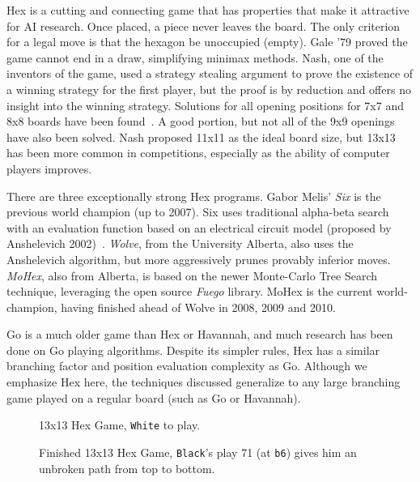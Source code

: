 \documentclass{acm_proc_article-sp}
\newcommand{\black}{\texttt{Black}}
\newcommand{\white}{\texttt{White}}
\newcommand{\loc}[1]{\texttt{#1}}
\begin{document}
Hex is a cutting and connecting game that
has properties that make it attractive for AI research. 
Once placed, a piece never leaves the board. 
The only criterion for a legal move is that the hexagon be unoccupied (empty). 
Gale '79 proved the game cannot end in a draw, simplifying minimax methods. 
Nash, one of the inventors of the game, used a strategy stealing argument to prove the existence of a winning strategy for the first player, but the proof is by reduction and offers no insight into the winning strategy.
Solutions for all opening positions for 7x7 and 8x8 boards have been found~\cite{henderson2009solving}. 
A good portion, but not all of the 9x9 openings have also been solved. 
Nash proposed 11x11 as the ideal board size, but 13x13 has been more common in competitions, especially as the ability of computer players improves.

There are three exceptionally strong Hex programs.  Gabor Melis' \emph{Six} is the previous world champion (up to 2007). 
Six uses traditional alpha-beta search with an evaluation function based on an electrical circuit model (proposed by Anshelevich 2002)~\cite{anshelevich2002hierarchical}. 
\emph{Wolve}, from the University Alberta, also uses the Anshelevich algorithm, but more aggressively prunes provably inferior moves. 
\emph{MoHex}, also from Alberta, is based on the newer Monte-Carlo Tree Search technique, leveraging the open source \emph{Fuego} library. 
MoHex is the current world-champion, having finished ahead of Wolve in 2008, 2009 and 2010.

Go is a much older game than Hex or Havannah, and much research has been done on Go playing algorithms. 
Despite its simpler rules, Hex has a similar branching factor and position evaluation complexity as Go. 
Although we emphasize Hex here, the techniques discussed generalize to any large branching game played on a regular board
(such as Go or Havannah).

\begin{figure}[tb]
	\caption{13x13 Hex Game, \white{} to play.}
	\label{fig:13x13inprogress}
\end{figure}

\begin{figure}[tb]
	\caption{Finished 13x13 Hex Game, \black{}'s play 71 (at \loc{b6}) gives him an unbroken path from top to bottom.}
	\label{fig:13x13finished}
\end{figure}
\end{document}
